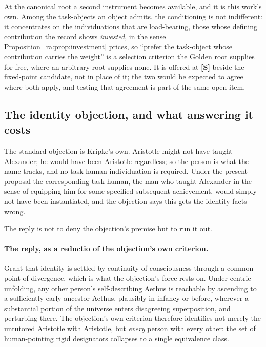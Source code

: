 \documentclass[11pt]{article}
\numberwithin{equation}{section}
\theoremstyle{plain}
\theoremstyle{definition}
\theoremstyle{remark}
\begin{document}
At the canonical root a second instrument becomes available, and it is
this work's own. Among the task-objects an object admits, the
conditioning is not indifferent: it concentrates on the individuations
that are load-bearing, those whose defining contribution the record
shows \emph{invested}, in the sense
Proposition~\ref{ra:prop:investment} prices, so ``prefer the
task-object whose contribution carries the weight'' is a selection
criterion the Golden root supplies for free, where an arbitrary root
supplies none. It is offered at \textbf{[S]} beside the fixed-point
candidate, not in place of it; the two would be expected to agree
where both apply, and testing that agreement is part of the same open
item.

\subsection{The identity objection, and what answering it costs}
\label{to:sub:identity}

The standard objection is Kripke's own. Aristotle might not have taught
Alexander; he would have been Aristotle regardless; so the person is
what the name tracks, and no task-human individuation is required.
Under the present proposal the corresponding task-human, the man who
taught Alexander in the sense of equipping him for some specified
subsequent achievement, would simply not have been instantiated, and
the objection says this gets the identity facts wrong.

The reply is not to deny the objection's premise but to run it out.

\paragraph{The reply, as a reductio of the objection's own criterion.}\label{to:rem:reductio}
Grant that identity is settled by continuity of consciousness through a
common point of divergence, which is what the objection's force rests
on. Under centric unfolding, any other person's self-describing Aethus
is reachable by ascending to a sufficiently early ancestor Aethus, plausibly in infancy or before, wherever a substantial portion of the
universe enters disagreeing superposition, and perturbing there. The
objection's own criterion therefore identifies not merely the untutored
Aristotle with Aristotle, but \emph{every} person with every other: the
set of human-pointing rigid designators collapses to a single
equivalence class.
\end{document}
